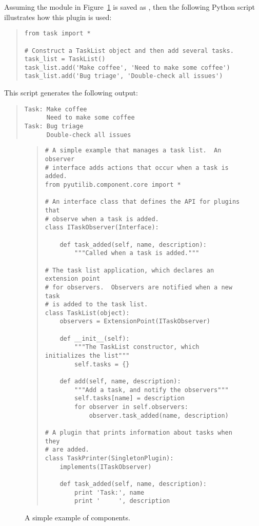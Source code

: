 

Assuming the module in Figure~\ref{fig:example1} 
is saved as , then the following Python script 
illustrates how this plugin is used:
\begin{quotation}
\begin{lstlisting}
from task import *

# Construct a TaskList object and then add several tasks.
task_list = TaskList()
task_list.add('Make coffee', 'Need to make some coffee')
task_list.add('Bug triage', 'Double-check all issues')
\end{lstlisting}
\end{quotation}
This script generates the following output:
\begin{quotation}
\begin{lstlisting}
Task: Make coffee
      Need to make some coffee
Task: Bug triage
      Double-check all issues
\end{lstlisting}
\end{quotation}


\begin{figure}
\center
\begin{quotation}
\begin{lstlisting}
# A simple example that manages a task list.  An observer 
# interface adds actions that occur when a task is added.
from pyutilib.component.core import *

# An interface class that defines the API for plugins that
# observe when a task is added.
class ITaskObserver(Interface):

    def task_added(self, name, description):
        """Called when a task is added."""

# The task list application, which declares an extension point
# for observers.  Observers are notified when a new task
# is added to the task list.
class TaskList(object):
    observers = ExtensionPoint(ITaskObserver)

    def __init__(self):
        """The TaskList constructor, which initializes the list"""
        self.tasks = {}

    def add(self, name, description):
        """Add a task, and notify the observers"""
        self.tasks[name] = description
        for observer in self.observers:
            observer.task_added(name, description)

# A plugin that prints information about tasks when they
# are added.
class TaskPrinter(SingletonPlugin):
    implements(ITaskObserver)

    def task_added(self, name, description):
        print 'Task:', name
        print '     ', description
\end{lstlisting}
\end{quotation}
\caption{A simple example of \pcasp components.}
\label{fig:example1}
\end{figure}



